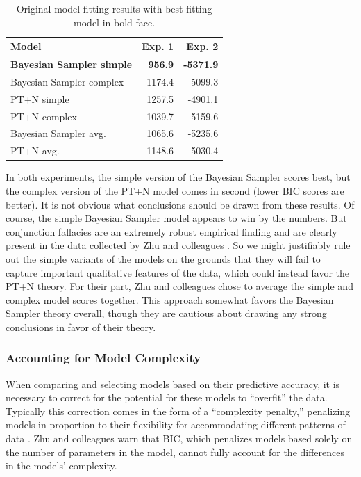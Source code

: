 \documentclass[
  english,
  man,floatsintext]{apa6}
\begin{document}
\begin{table}

\caption{\label{tab:table1}Original model fitting results with best-fitting model in bold face.}
\centering
\begin{tabular}[t]{lrr}
\toprule
Model & Exp. 1 & Exp. 2\\
\midrule
\textbf{Bayesian Sampler simple} & \textbf{956.9} & \textbf{-5371.9}\\
Bayesian Sampler complex & 1174.4 & -5099.3\\
PT+N simple & 1257.5 & -4901.1\\
PT+N complex & 1039.7 & -5159.6\\
Bayesian Sampler avg. & 1065.6 & -5235.6\\
\addlinespace
PT+N avg. & 1148.6 & -5030.4\\
\bottomrule
\end{tabular}
\end{table}

In both experiments, the simple version of the Bayesian Sampler scores best, but the complex version of the PT+N model comes in second (lower BIC scores are better). It is not obvious what conclusions should be drawn from these results. Of course, the simple Bayesian Sampler model appears to win by the numbers. But conjunction fallacies are an extremely robust empirical finding \autocite{mellers.etal2001,sides.etal2002} and are clearly present in the data collected by Zhu and colleagues \autocite*{zhu.etal2020}. So we might justifiably rule out the simple variants of the models on the grounds that they will fail to capture important qualitative features of the data, which could instead favor the PT+N theory. For their part, Zhu and colleagues \autocite*{zhu.etal2020} chose to average the simple and complex model scores together. This approach somewhat favors the Bayesian Sampler theory overall, though they are cautious about drawing any strong conclusions in favor of their theory.

\hypertarget{accounting-for-model-complexity}{%
\subsubsection{Accounting for Model Complexity}\label{accounting-for-model-complexity}}

When comparing and selecting models based on their predictive accuracy, it is necessary to correct for the potential for these models to ``overfit'' the data. Typically this correction comes in the form of a ``complexity penalty,'' penalizing models in proportion to their flexibility for accommodating different patterns of data \autocite{gelman.etal2014}. Zhu and colleagues \autocite*{zhu.etal2020} warn that BIC, which penalizes models based solely on the number of parameters in the model, cannot fully account for the differences in the models' complexity.
\end{document}

